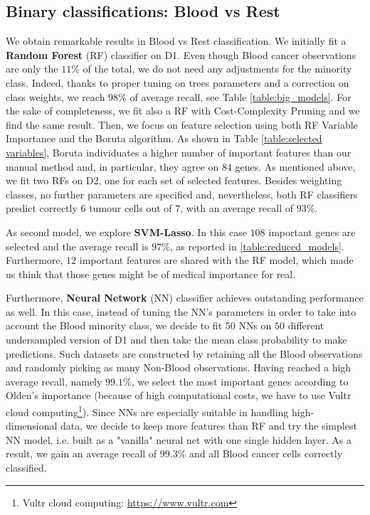 \documentclass[a4paper,11pt, oneside]{article}  %
\begin{document}
\subsection{Binary classifications: Blood vs Rest}
We obtain remarkable results in Blood vs Rest classification. We initially fit a \textbf{Random Forest} (RF) classifier on D1. Even though Blood cancer observations are only the $11\%$ of the total,  we do not need any adjustments for the minority class.  Indeed, thanks to proper tuning on trees parameters and a correction on class weights, we reach $98\%$ of average recall,  see Table \ref{table:big_models}. For the sake of completeness, we fit also a RF with Cost-Complexity Pruning and we find the same result. Then,  we focus on feature selection using both RF Variable Importance and the Boruta algorithm. As shown in Table \ref{table:selected variables},  Boruta individuates a higher number of important features than our manual method and,  in particular,  they agree on $84$ genes. As mentioned above,  we fit two RFs on D2, one for each set of selected features. Besides weighting classes, no further parameters are specified and, nevertheless, both RF classifiers predict correctly $6$ tumour cells out of $7$,  with an average recall of $93\%$.

As second model, we explore \textbf{SVM-Lasso}. In this case $108$ important genes are selected and the average recall is $97\%$, as reported in \ref{table:reduced_models}. Furthermore, $12$ important features are shared with the RF model, which made us think that those genes might be of medical importance for real.

Furthermore, \textbf{Neural Network} (NN) classifier achieves outstanding performance as well.  In this case,  instead of tuning the NN's parameters in order to take into account the Blood minority class,  we decide to fit $50$ NNs on $50$ different undersampled version of D1 and then take the mean class probability to make predictions. Such datasets are constructed by retaining all the Blood observations and randomly picking as many Non-Blood observations.  Having reached a high average recall, namely $99.1\%$,  we select the most important genes according to Olden's importance (because of high computational costs, we have to use Vultr cloud computing\footnote{Vultr cloud computing: \url{https://www.vultr.com}}). Since NNs are especially suitable in handling high-dimensional data, we decide to keep more features than RF and try the simplest NN model,  i.e.  built as a "vanilla" neural net with one single hidden layer.  As a result, we gain an average recall of $99.3\%$ and all Blood cancer cells correctly classified. 
\end{document}
